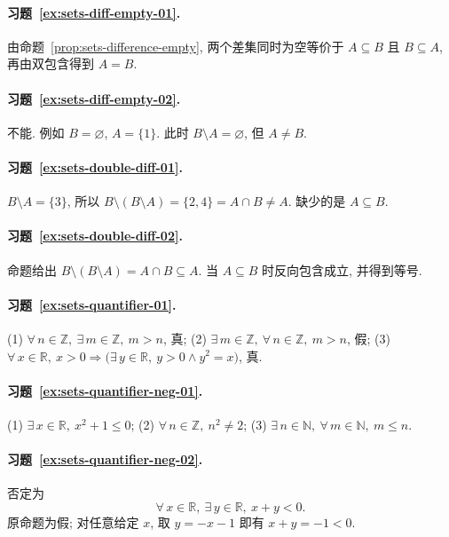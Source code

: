 \documentclass[usesamecnt, thmcnt=section, lang=cn, newtx, 10pt, scheme=chinese]{elegantbook}
\begin{document}
\paragraph*{习题~\ref{ex:sets-diff-empty-01}.}
由命题~\ref{prop:sets-difference-empty}, 两个差集同时为空等价于 $A\subseteq B$ 且 $B\subseteq A$, 再由双包含得到 $A=B$.

\paragraph*{习题~\ref{ex:sets-diff-empty-02}.}
不能. 例如 $B=\varnothing$, $A=\{1\}$. 此时 $B\setminus A=\varnothing$, 但 $A\neq B$.

\paragraph*{习题~\ref{ex:sets-double-diff-01}.}
$B\setminus A=\{3\}$, 所以 $B\setminus(B\setminus A)=\{2,4\}=A\cap B\neq A$. 缺少的是 $A\subseteq B$.

\paragraph*{习题~\ref{ex:sets-double-diff-02}.}
命题给出 $B\setminus(B\setminus A)=A\cap B\subseteq A$. 当 $A\subseteq B$ 时反向包含成立, 并得到等号.

\paragraph*{习题~\ref{ex:sets-quantifier-01}.}
(1) $\forall\,n\in\mathbb Z,\ \exists\,m\in\mathbb Z,\ m>n$, 真; (2) $\exists\,m\in\mathbb Z,\ \forall\,n\in\mathbb Z,\ m>n$, 假; (3) $\forall\,x\in\mathbb R,\ x>0\Rightarrow\bigl(\exists\,y\in\mathbb R,\ y>0\wedge y^2=x\bigr)$, 真.

\paragraph*{习题~\ref{ex:sets-quantifier-neg-01}.}
(1) $\exists\,x\in\mathbb R,\ x^2+1\leq0$; (2) $\forall\,n\in\mathbb Z,\ n^2\neq2$; (3) $\exists\,n\in\mathbb N,\ \forall\,m\in\mathbb N,\ m\leq n$.

\paragraph*{习题~\ref{ex:sets-quantifier-neg-02}.}
否定为
\[
 \forall\,x\in\mathbb R,\ \exists\,y\in\mathbb R,\ x+y<0.
\]
原命题为假; 对任意给定 $x$, 取 $y=-x-1$ 即有 $x+y=-1<0$.
\end{document}
